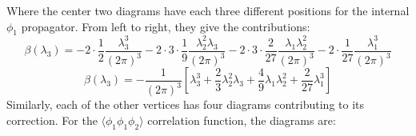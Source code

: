 \documentclass{article}
\begin{document}
\begin{center}
\hspace{1cm}
\end{center}
Where the center two diagrams have each three different positions for the internal $\phi_1$ propagator. From left to right, they give the contributions:
\begin{equation}
    \beta(\lambda_3) = -2\cdot\frac{1}{2}\frac{\lambda_3^3}{(2\pi)^3}
    -2\cdot3\cdot \frac{1}{9} \frac{\lambda_2^2\lambda_3}{(2\pi)^3}
    -2\cdot3\cdot\frac{2}{27}\frac{\lambda_1\lambda_2^2}{(2\pi)^3}
    -2\cdot\frac{1}{27}\frac{\lambda_1^3}{(2\pi)^3}
\end{equation}
\begin{equation}
    \beta(\lambda_3) = -\frac{1}{(2\pi)^3} \left[
        \lambda_3^3 + \frac{2}{3}\lambda_2^2\lambda_3 +
        \frac{4}{9}\lambda_1\lambda_2^2 + \frac{2}{27}\lambda_1^3
    \right]
\end{equation}
Similarly, each of the other vertices has four diagrams contributing to its correction. For the $\langle \phi_1 \phi_1 \phi_2 \rangle$ correlation function, the diagrams are:
\end{document}
